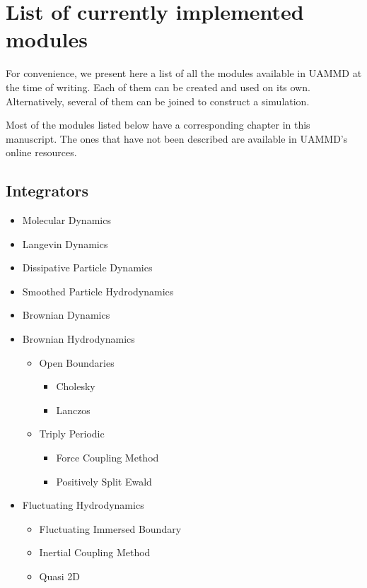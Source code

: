 \documentclass[ twoside,openright,titlepage,numbers=noenddot,%
headinclude,footinclude,cleardoublepage=empty,abstract=on,
BCOR=5mm,paper=a4,fontsize=11pt, dvipsnames
]{scrreprt}
\newcommand{\uammd}{\gls{UAMMD}\xspace}
\begin{document}

\chapter{List of currently implemented modules}\label{sec:modulelist}

For convenience, we present here a list of all the modules available in \uammd at the time of writing. Each of them can be created and used on its own. Alternatively, several of them can be joined to construct a simulation.

Most of the modules listed below have a corresponding chapter in this manuscript. The ones that have not been described are available in \uammd's online resources.

\section{Integrators}

\begin{itemize}
\item Molecular Dynamics
\item Langevin Dynamics
\item Dissipative Particle Dynamics
\item Smoothed Particle Hydrodynamics
\item Brownian Dynamics
\item Brownian Hydrodynamics
  \begin{itemize}
  \item Open Boundaries
    \begin{itemize}
    \item Cholesky
    \item Lanczos
    \end{itemize}
  \item Triply Periodic
    \begin{itemize}
    \item Force Coupling Method
    \item Positively Split Ewald
    \end{itemize}
  \end{itemize}
\item Fluctuating Hydrodynamics
  \begin{itemize}
  \item Fluctuating Immersed Boundary
  \item Inertial Coupling Method
  \item Quasi 2D
  \end{itemize}
\end{itemize}
\end{document}
